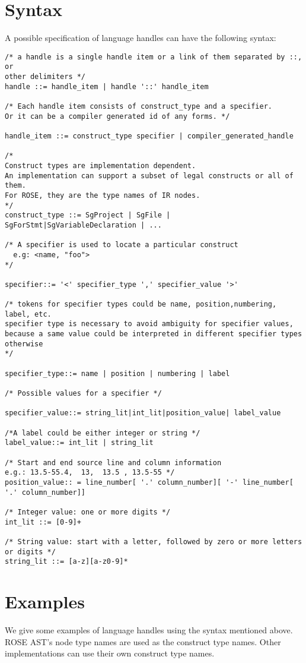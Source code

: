 \section{Syntax}
A possible specification of language handles can have the following syntax:

\begin{verbatim}
/* a handle is a single handle item or a link of them separated by ::, or
other delimiters */
handle ::= handle_item | handle '::' handle_item

/* Each handle item consists of construct_type and a specifier. 
Or it can be a compiler generated id of any forms. */

handle_item ::= construct_type specifier | compiler_generated_handle

/* 
Construct types are implementation dependent.
An implementation can support a subset of legal constructs or all of them.
For ROSE, they are the type names of IR nodes.  
*/
construct_type ::= SgProject | SgFile | SgForStmt|SgVariableDeclaration | ...

/* A specifier is used to locate a particular construct
  e.g: <name, "foo">
*/

specifier::= '<' specifier_type ',' specifier_value '>'                

/* tokens for specifier types could be name, position,numbering, label, etc. 
specifier type is necessary to avoid ambiguity for specifier values, 
because a same value could be interpreted in different specifier types otherwise
*/

specifier_type::= name | position | numbering | label 

/* Possible values for a specifier */

specifier_value::= string_lit|int_lit|position_value| label_value

/*A label could be either integer or string */
label_value::= int_lit | string_lit

/* Start and end source line and column information 
e.g.: 13.5-55.4,  13,  13.5 , 13.5-55 */
position_value:: = line_number[ '.' column_number][ '-' line_number[ '.' column_number]]

/* Integer value: one or more digits */
int_lit ::= [0-9]+

/* String value: start with a letter, followed by zero or more letters or digits */
string_lit ::= [a-z][a-z0-9]*

\end{verbatim}

\section{Examples}
We give some examples of language handles using the syntax mentioned above. 
ROSE AST's node type names are used as the construct type names. 
Other implementations can use their own construct type names.


